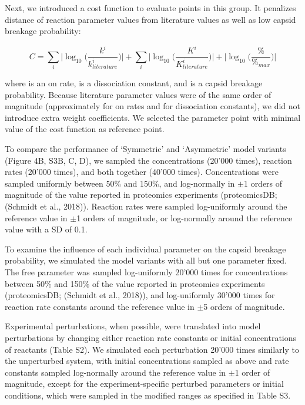 Next, we introduced a cost function to evaluate points in this group. It penalizes distance of reaction parameter values from literature values as well as low capsid breakage probability:

\begin{equation}
C = \sum_{i} \big| \log_{10} \big( \frac{k^i}{k^i_{literature}} \big) \big| + \sum_{i} \big| \log_{10} \big( \frac{K^i}{K^i_{literature}} \big) \big| + \big| \log_{10} \big( \frac{\%}{\%_{max}} \big) \big|
\end{equation}

where   is an on rate,   is a dissociation constant, and   is a capsid breakage probability. Because literature parameter values were of the same order of magnitude (approximately   for on rates and   for dissociation constants), we did not introduce extra weight coefficients. We selected the parameter point with minimal value of the cost function as reference point.

To compare the performance of ‘Symmetric’ and ‘Asymmetric’ model variants (Figure 4B, S3B, C, D), we sampled the concentrations (20’000 times), reaction rates (20’000 times), and both together (40’000 times). Concentrations were sampled uniformly between 50\% and 150\%, and log-normally in $\pm$1 orders of magnitude of the value reported in proteomics experiments (proteomicsDB; (Schmidt et al., 2018)). Reaction rates were sampled log-uniformly around the reference value in $\pm$1 orders of magnitude, or log-normally around the reference value with a SD of 0.1.

To examine the influence of each individual parameter on the capsid breakage probability, we simulated the model variants with all but one parameter fixed. The free parameter was sampled log-uniformly 20’000 times for concentrations between 50\% and 150\% of the value reported in proteomics experiments (proteomicsDB; (Schmidt et al., 2018)), and log-uniformly 30’000 times for reaction rate constants around the reference value in $\pm$5 orders of magnitude.

Experimental perturbations, when possible, were translated into model perturbations by changing either reaction rate constants or initial concentrations of reactants (Table S2). We simulated each perturbation 20’000 times similarly to the unperturbed system, with initial concentrations sampled as above and rate constants sampled log-normally around the reference value in $\pm$1 order of magnitude, except for the experiment-specific perturbed parameters or initial conditions, which were sampled in the modified ranges as specified in Table S3.

